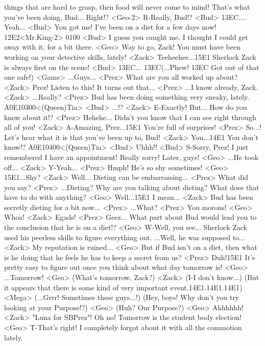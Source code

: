 things that are hard to grasp, then food will never come to mind! 
That's what you've been doing, Bud... Right!? 
<Geo-2> R-Really, Bud!? 
<Bud> {13}{EC}.... 
Yeah... 
<Bud> You got me! 
I've been on a diet for a few days now! 
{12}{E2}<Mr.King-2> {01}{00} 
<Bud> I guess you caught me. I thought I could get away with it, for a bit there. 
<Geo> Way to go, Zack! 
You must have been working on your detective skills, lately! 
<Zack> Teeheehee...{15}{E1} Sherlock Zack is always first on the scene! 
<Bud> {13}{EC}... 
{13}{EC}(...Phew!  {13}{EC} Got out of that one safe!) 
<Game> ...Guys... 
<Prez> What are you all worked up about? 
<Zack> Prez! Listen to this! 
It turns out that... 
<Prez> ...I know already, Zack. 
<Zack> ...Really? 
<Prez> Bud has been doing something very sneaky, lately. 
{A0}{E1}{03}{00}<(Queen)Tia> 
<Bud> ...!? 
<Zack> E-Exactly! 
But... How do you know about it!? 
<Prez> Hehehe... 
Didn't you know that I can see right through all of you! 
<Zack> A-Amazing, Prez...{15}{E1} You're full of surprises! 
<Prez> So...! 
Let's hear what it is that you've been up to, Bud! 
<Zack> You...{14}{E1} You don't know!? 
{A0}{E1}{04}{00}<(Queen)Tia> 
<Bud> Uhhh!! 
<Bud> S-Sorry, Prez! 
I just remembered I have an appointment! Really sorry! 
Later, guys! 
<Geo> ...He took off... 
<Zack> Y-Yeah... 
<Prez> Hmph! He's so shy sometimes! 
<Geo> {15}{E1}...Shy? 
<Zack> Well... Dieting can be embarrassing... 
<Prez> What did you say? 
<Prez> ...Dieting? 
Why are you talking about dieting? 
What does that have to do with anything? 
<Geo> Well...{15}{E1} I mean... 
<Zack> Bud has been secretly dieting for a bit now... 
<Prez> ...What? 
<Prez> You morons! 
<Geo> Whoa! 
<Zack> Egads! 
<Prez> Geez... 
What part about Bud would lead you to the conclusion that he is on a diet!? 
<Geo> W-Well, you see... 
Sherlock Zack used his peerless skills to figure everything out. 
...Well, he was supposed to... 
<Zack> My reputation is ruined... 
<Geo> But if Bud isn't on a diet, then what is he doing that 
he feels he has to keep a secret from us? 
<Prez> Duh!{15}{E1} It's pretty easy to figure out once you think about what day tomorrow is! 
<Geo> ...Tomorrow! 
<Geo> (What's tomorrow, Zack?) 
<Zack> (I-I don't know...) 
(But it appears that  there is some kind of  very important event.{14}{E1}.{14}{E1}.{14}{E1}) 
<Mega> (...Grrr!  Sometimes these guys...!) 
(Hey, boys!  Why don't you try  looking at your Purpose!?) 
<Geo> (Huh? Our Purpose?) 
<Geo> Ahhhhhh! 
<Zack> "Luna for SBPrez"! 
Oh no! Tomorrow is the student body election! 
<Geo> T-That's right! 
I completely forgot about it with all the commotion lately. 
